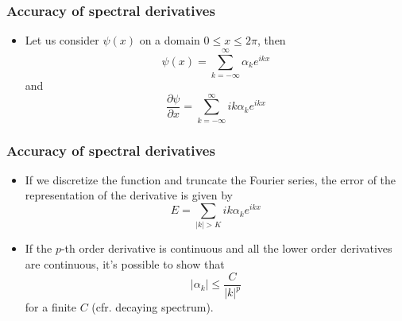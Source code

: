 \documentclass[aspectratio=43,9pt]{beamer}
\begin{document}
%
%
\begin{frame}
	\frametitle{Accuracy of spectral derivatives}
	\vfill\begin{itemize}
		\item Let us consider $\psi(x)$ on a domain $0 \le x \le 2\pi$, then
			\begin{equation*}
				\psi (x) = \sum_{k=-\infty}^{\infty} \alpha_k e^{ik x}
			\end{equation*}
			and 
			\begin{equation*}
				\frac{\partial \psi}{\partial x} = \sum_{k=-\infty}^{\infty} i k \alpha_k e^{i k x}
			\end{equation*}
	\end{itemize}\vfill
\end{frame}
%
%
\begin{frame}
	\frametitle{Accuracy of spectral derivatives}
	\vfill\begin{itemize}
		\item If we discretize the function and truncate the Fourier series, the error of the representation of the derivative is given by
			\begin{equation*}
				E = \sum_{\vert k \vert > K} i k \alpha_k e^{ikx}
			\end{equation*}\vfill
		\item If the $p$-th order derivative is continuous and all the lower order derivatives are continuous, it's possible to show that
			\begin{equation*}
				| \alpha_k | \le \frac{C}{\vert k \vert^p}
			\end{equation*}
			for a finite $C$ (cfr. decaying spectrum).
	\end{itemize}\vfill
\end{frame}
%
%
\end{document}
